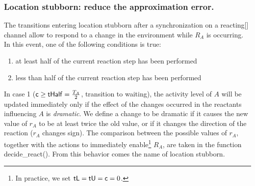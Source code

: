 \documentclass{llncs}
\newcommand{\ta}{Timed Automaton}
\begin{document}
\subsubsection{Location {\sf stubborn}: reduce the approximation error.}
The transitions entering location {\sf stubborn} after a synchronization on a {\sf reacting[]}
channel allow to respond to a change in the environment while $R_A$ is occurring.
% 
In this event, one of the following conditions is true:
\begin{enumerate}
  \item at least half of the current reaction step has been performed
  \item less than half of the current reaction step has been performed
\end{enumerate}

In case 1 (${\sf c} \ge {\sf tHalf} = \frac{T_A}{2}$, transition to {\sf waiting}), the activity level of $A$
will be updated immediately only if the effect of the changes occurred in the reactants influencing
$A$ is \emph{dramatic}. We define a change to be dramatic if it causes the new value of $r_A$ to be at least
twice the old value, or if it changes the direction of the reaction ($r_A$ changes sign). The comparison
between the possible values of $r_A$, together with the actions to immediately enable\footnote{
In practice, we set ${\sf tL} = {\sf tU} = {\sf c} = 0$.} $R_A$,
are taken in the function {\sf decide\_react()}. From this behavior comes the name of location {\sf stubborn}.
\end{document}
